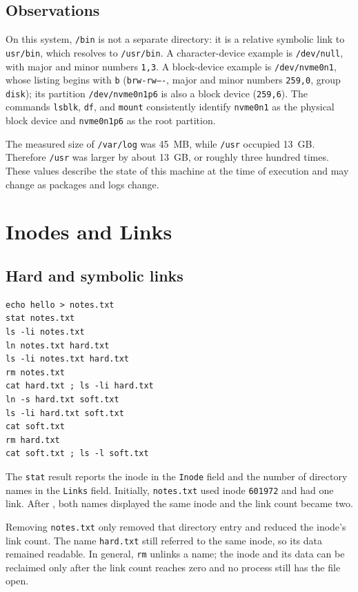 \documentclass[12pt,a4paper]{article}
\newcommand{\inlinecmd}[1]{\texttt{\detokenize{#1}}}
\begin{document}
\subsection{Observations}

On this system, \texttt{/bin} is not a separate directory: it is a relative symbolic link to \texttt{usr/bin}, which resolves to \texttt{/usr/bin}. A character-device example is \texttt{/dev/null}, with major and minor numbers \texttt{1,3}. A block-device example is \texttt{/dev/nvme0n1}, whose listing begins with \texttt{b} (\texttt{brw-rw----}, major and minor numbers \texttt{259,0}, group \texttt{disk}); its partition \texttt{/dev/nvme0n1p6} is also a block device (\texttt{259,6}). The commands \texttt{lsblk}, \texttt{df}, and \texttt{mount} consistently identify \texttt{nvme0n1} as the physical block device and \texttt{nvme0n1p6} as the root partition.

The measured size of \texttt{/var/log} was 45~MB, while \texttt{/usr} occupied 13~GB. Therefore \texttt{/usr} was larger by about 13~GB, or roughly three hundred times. These values describe the state of this machine at the time of execution and may change as packages and logs change.

\newpage
\section{Inodes and Links}

\subsection{Hard and symbolic links}

\begin{lstlisting}
echo hello > notes.txt
stat notes.txt
ls -li notes.txt
ln notes.txt hard.txt
ls -li notes.txt hard.txt
rm notes.txt
cat hard.txt ; ls -li hard.txt
ln -s hard.txt soft.txt
ls -li hard.txt soft.txt
cat soft.txt
rm hard.txt
cat soft.txt ; ls -l soft.txt
\end{lstlisting}

The \texttt{stat} result reports the inode in the \texttt{Inode} field and the number of directory names in the \texttt{Links} field. Initially, \texttt{notes.txt} used inode \texttt{601972} and had one link. After \inlinecmd{ln notes.txt hard.txt}, both names displayed the same inode and the link count became two.

Removing \texttt{notes.txt} only removed that directory entry and reduced the inode's link count. The name \texttt{hard.txt} still referred to the same inode, so its data remained readable. In general, \texttt{rm} unlinks a name; the inode and its data can be reclaimed only after the link count reaches zero and no process still has the file open.
\end{document}
